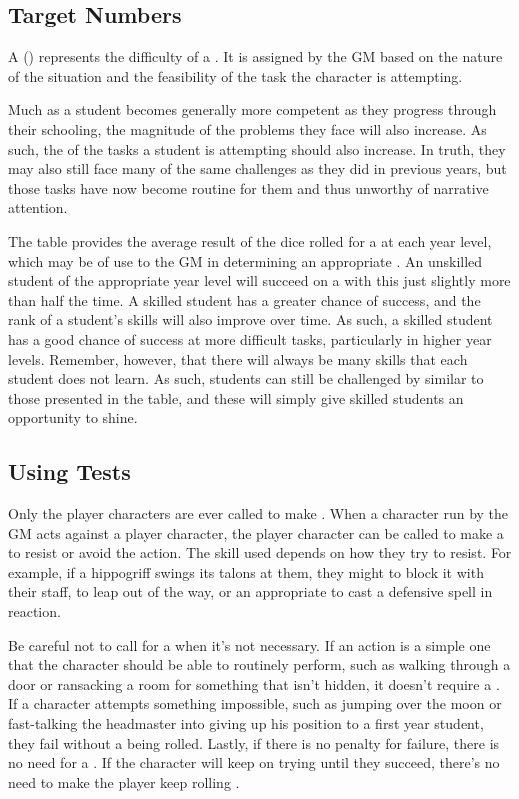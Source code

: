 \subsection{Target Numbers}

A {\targetnumber} ({\tn}) represents the difficulty of a {\test}.
It is assigned by the GM based on the nature of the situation and the feasibility of the task the character is attempting.

Much as a student becomes generally more competent as they progress through their schooling, the magnitude of the problems they face will also increase.
As such, the {\tns} of the tasks a student is attempting should also increase.
In truth, they may also still face many of the same challenges as they did in previous years, but those tasks have now become routine for them and thus unworthy of narrative attention.

The  table provides the average result of the dice rolled for a {\test} at each year level, which may be of use to the GM in determining an appropriate {\tn}.
An unskilled student of the appropriate year level will succeed on a {\test} with this {\tn} just slightly more than half the time.
A skilled student has a greater chance of success, and the rank of a student's skills will also improve over time.
As such, a skilled student has a good chance of success at more difficult tasks, particularly in higher year levels.
Remember, however, that there will always be many skills that each student does not learn.
As such, students can still be challenged by {\tns} similar to those presented in the table, and these will simply give skilled students an opportunity to shine.

\subsection{Using Tests}

Only the player characters are ever called to make {\tests}.
When a character run by the GM acts against a player character, the player character can be called to make a {\test} to resist or avoid the action.
The skill used depends on how they try to resist.
For example, if a hippogriff swings its talons at them, they might {\test}  to block it with their staff, {\test}  to leap out of the way, or {\test} an appropriate {\magicskill} to cast a defensive spell in reaction.

Be careful not to call for a {\test} when it's not necessary.
If an action is a simple one that the character should be able to routinely perform, such as walking through a door or ransacking a room for something that isn't hidden, it doesn't require a {\test}.
If a character attempts something impossible, such as jumping over the moon or fast-talking the headmaster into giving up his position to a first year student, they fail without a {\test} being rolled.
Lastly, if there is no penalty for failure, there is no need for a {\test}.
If the character will keep on trying until they succeed, there's no need to make the player keep rolling {\tests}.


